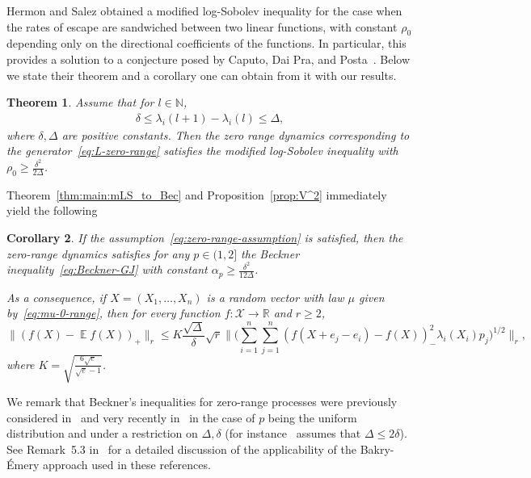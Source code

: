 \documentclass[a4paper]{amsart}
\newtheorem{theorem}{Theorem}[section]
\newtheorem{corollary}[theorem]{Corollary} %
\theoremstyle{definition}
\theoremstyle{remark}
\numberwithin{equation}{section}
\newcommand*{\RR}{\mathbb{R}}
\newcommand*{\NN}{\mathbb{N}}
\newcommand{\calX}{\mathcal{X}}
\DeclareMathOperator{\EE}{\mathbb{E}} %
\begin{document}
Hermon and Salez obtained a modified log-Sobolev inequality for the case when the rates of escape are sandwiched between two linear functions, with constant $\rho_0$ depending only on the directional coefficients of the functions. In particular, this provides a solution to a conjecture posed by Caputo, Dai Pra, and Posta~\cite{MR2322692,MR2548501}. Below we state their theorem and a corollary one can obtain from it with our results.

\begin{theorem}
Assume that for $l \in \NN$,
\begin{align}\label{eq:zero-range-assumption}
  \delta \leq \lambda_i(l+1) - \lambda_i(l) \leq \Delta,
\end{align}
where $\delta,\Delta$ are positive constants.
Then the zero range dynamics corresponding to the generator~\eqref{eq:L-zero-range} satisfies the modified log-Sobolev inequality with $\rho_0 \ge \frac{\delta^2}{2\Delta}$.
\end{theorem}

Theorem~\ref{thm:main:mLS_to_Bec} and Proposition~\ref{prop:V^2} immediately yield the following

\begin{corollary}\label{proc:zero range}
If the assumption~\eqref{eq:zero-range-assumption} is satisfied, then the zero-range dynamics satisfies for any $p \in (1,2]$ the Beckner inequality~\eqref{eq:Beckner-GJ} with constant $\alpha_p \ge \frac{\delta^2}{12\Delta}$.

As a consequence, if $X=(X_1,\ldots,X_n)$ is a random vector with law $\mu$ given by~\eqref{eq:mu-0-range}, then for every function $f\colon \calX \to \RR$ and $r \ge 2$,
\begin{displaymath}
  \|(f(X) - \EE f(X))_+\|_r \le K\frac{\sqrt{\Delta}}{\delta}\sqrt{r}\Big\|\Big(\sum_{i=1}^n\sum_{j=1}^n (f(X + e_j - e_i) - f(X))_-^2\lambda_i(X_i) p_j\Big)^{1/2}\Big\|_r,
\end{displaymath}
where $K = \sqrt{\frac{6\sqrt{e}}{\sqrt{e}-1}}$.
\end{corollary}

We remark that Beckner's inequalities for zero-range processes were previously considered in~\cite{MR3693525} and very recently in~\cite{conforti2020probabilistic} in the case of $p$ being the uniform distribution and under a restriction on $\Delta,\delta$ (for instance~\cite{conforti2020probabilistic} assumes that $\Delta \le 2\delta$). See Remark~5.3 in~\cite{conforti2020probabilistic} for a detailed discussion of the applicability of the Bakry-\'Emery approach used in these references. 
\end{document}
